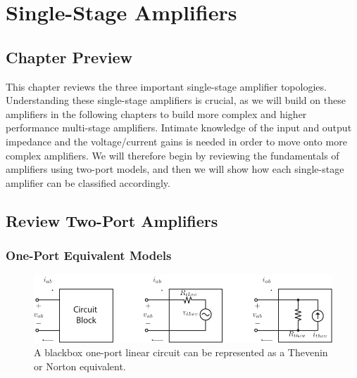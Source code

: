 \chapter{Single-Stage Amplifiers}
\graphicspath{{./figs_amps_single_stage/}}
\section{Chapter Preview}
This chapter reviews the three important single-stage amplifier topologies.  Understanding these single-stage amplifiers is crucial, as we will build on these amplifiers in the following chapters to build more complex and higher performance multi-stage amplifiers.  Intimate knowledge of the input and output impedance and the voltage/current gains is needed in order to move onto more complex amplifiers.  We will therefore begin by reviewing the fundamentals of amplifiers using two-port models, and then we will show how each single-stage amplifier can be classified accordingly.  
\section{Review Two-Port Amplifiers}
\subsection{One-Port Equivalent Models}
\begin{figure}[tb]
\begin{center}
\includegraphics[scale=1]{oneports}
\end{center}
\caption{A blackbox one-port linear circuit can be represented as a Thevenin or Norton equivalent.} \label{fig:oneports}
\end{figure}

